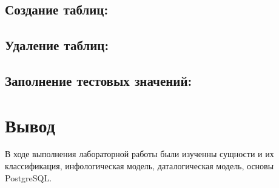 \documentclass[12pt,onecolumn]{article}
\begin{document}
\subsection*{Создание таблиц:}

\subsection*{Удаление таблиц:}

\subsection*{Заполнение тестовых значений:}

\section{Вывод}
В ходе выполнения лабораторной работы были изученны сущности и их классификация,
инфологическая модель, даталогическая модель, основы PostgreSQL.
\end{document}
